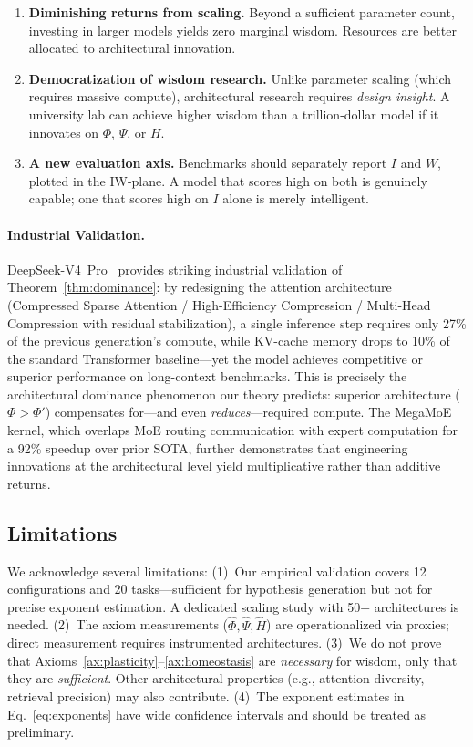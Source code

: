 \documentclass{article}
\begin{document}
\begin{enumerate}[leftmargin=*,itemsep=2pt]
    \item \textbf{Diminishing returns from scaling.}  Beyond a sufficient parameter count, investing in larger models yields zero marginal wisdom.  Resources are better allocated to architectural innovation.
    \item \textbf{Democratization of wisdom research.}  Unlike parameter scaling (which requires massive compute), architectural research requires \emph{design insight}.  A university lab can achieve higher wisdom than a trillion-dollar model if it innovates on $\Phi$, $\Psi$, or $H$.
    \item \textbf{A new evaluation axis.}  Benchmarks should separately report $I$ and $W$, plotted in the IW-plane.  A model that scores high on both is genuinely capable; one that scores high on $I$ alone is merely intelligent.
\end{enumerate}

\paragraph{Industrial Validation.}
DeepSeek-V4~Pro~\citep{deepseek_v4_2026} provides striking industrial
validation of Theorem~\ref{thm:dominance}: by redesigning the attention
architecture (Compressed Sparse Attention / High-Efficiency Compression /
Multi-Head Compression with residual stabilization), a single inference step
requires only 27\% of the previous generation's compute, while KV-cache memory
drops to 10\% of the standard Transformer baseline---yet the model achieves
competitive or superior performance on long-context benchmarks.
This is precisely the architectural dominance phenomenon our theory predicts:
superior architecture ($\Phi > \Phi'$) compensates for---and even
\emph{reduces}---required compute. The MegaMoE kernel, which overlaps
MoE routing communication with expert computation for a 92\% speedup over
prior SOTA, further demonstrates that engineering innovations at the
architectural level yield multiplicative rather than additive returns.

\subsection{Limitations}

We acknowledge several limitations:
(1)~Our empirical validation covers 12 configurations and 20 tasks---sufficient for hypothesis generation but not for precise exponent estimation.
A dedicated scaling study with 50+ architectures is needed.
(2)~The axiom measurements ($\hat{\Phi}, \hat{\Psi}, \hat{H}$) are operationalized via proxies; direct measurement requires instrumented architectures.
(3)~We do not prove that Axioms~\ref{ax:plasticity}--\ref{ax:homeostasis} are \emph{necessary} for wisdom, only that they are \emph{sufficient}.  Other architectural properties (e.g., attention diversity, retrieval precision) may also contribute.
(4)~The exponent estimates in Eq.~\ref{eq:exponents} have wide confidence intervals and should be treated as preliminary.
\end{document}
